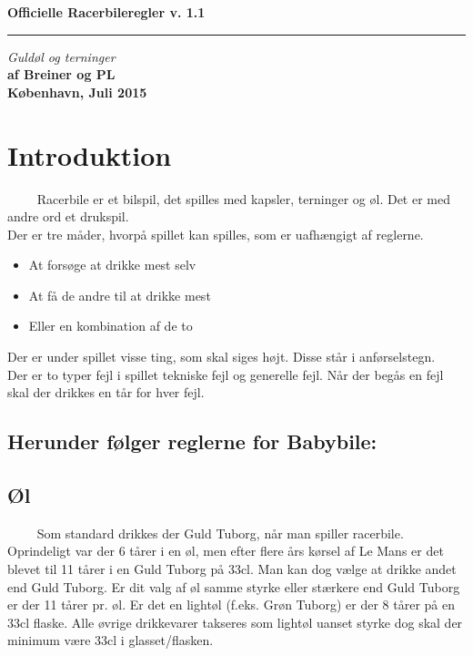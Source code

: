 \documentclass[12pt]{article}
\begin{document}
 \begin{flushright}
  {\Huge\bfseries Officielle Racerbileregler v. 1.1}\\
  \rule{\textwidth}{2pt}
  {\large\itshape Guldøl og terninger}\\
  {\bfseries af Breiner og PL\\[4ex]
K\o benhavn, Juli 2015\\}
 \end{flushright}
 \thispagestyle{empty}
 \clearpage


\newpage


\section*{Introduktion}

$\qquad$ Racerbile er et bilspil, det spilles med kapsler, terninger og øl. Det er med andre ord et drukspil.\\
Der er tre måder, hvorpå spillet kan spilles, som er uafhængigt af reglerne.
\begin{itemize}
	\item At forsøge at drikke mest selv
	\item At få de andre til at drikke mest
	\item Eller en kombination af de to
\end{itemize}

Der er under spillet visse ting, som skal siges højt. Disse står i anførselstegn.\\

Der er to typer fejl i spillet tekniske fejl og generelle fejl. Når der begås en fejl skal der drikkes en tår for hver fejl.\\

\subsection*{Herunder følger reglerne for Babybile:}


\subsection*{Øl}

$\qquad$ Som standard drikkes der Guld Tuborg, når man spiller racerbile. Oprindeligt var der 6 tårer i en øl, men efter flere års kørsel af Le Mans er det blevet til 11 tårer i en Guld Tuborg på 33cl. Man kan dog vælge at drikke andet end Guld Tuborg. Er dit valg af øl samme styrke eller stærkere end Guld Tuborg er der 11 tårer pr. øl. Er det en lightøl (f.eks. Grøn Tuborg) er der 8 tårer på en 33cl flaske. Alle øvrige drikkevarer takseres som lightøl uanset styrke dog skal der minimum være 33cl i glasset/flasken.
\end{document}
